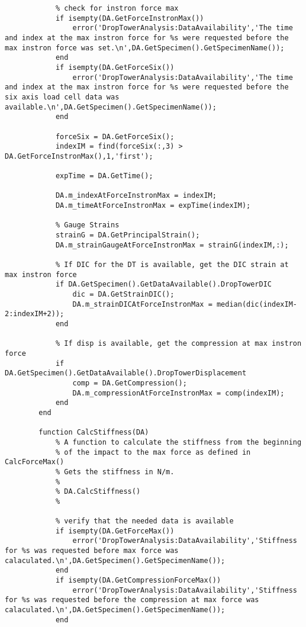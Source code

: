 \begin{lstlisting}
            % check for instron force max
            if isempty(DA.GetForceInstronMax())
                error('DropTowerAnalysis:DataAvailability','The time and index at the max instron force for %s were requested before the max instron force was set.\n',DA.GetSpecimen().GetSpecimenName());
            end
            if isempty(DA.GetForceSix())
                error('DropTowerAnalysis:DataAvailability','The time and index at the max instron force for %s were requested before the six axis load cell data was available.\n',DA.GetSpecimen().GetSpecimenName());
            end
            
            forceSix = DA.GetForceSix();
            indexIM = find(forceSix(:,3) > DA.GetForceInstronMax(),1,'first');
            
            expTime = DA.GetTime();
            
            DA.m_indexAtForceInstronMax = indexIM;
            DA.m_timeAtForceInstronMax = expTime(indexIM);
            
            % Gauge Strains
            strainG = DA.GetPrincipalStrain();
            DA.m_strainGaugeAtForceInstronMax = strainG(indexIM,:);
            
            % If DIC for the DT is available, get the DIC strain at max instron force
            if DA.GetSpecimen().GetDataAvailable().DropTowerDIC
                dic = DA.GetStrainDIC();
                DA.m_strainDICAtForceInstronMax = median(dic(indexIM-2:indexIM+2));
            end
            
            % If disp is available, get the compression at max instron force
            if DA.GetSpecimen().GetDataAvailable().DropTowerDisplacement
                comp = DA.GetCompression();
                DA.m_compressionAtForceInstronMax = comp(indexIM);
            end
        end
        
        function CalcStiffness(DA)
            % A function to calculate the stiffness from the beginning 
            % of the impact to the max force as defined in CalcForceMax()
            % Gets the stiffness in N/m.
            %
            % DA.CalcStiffness()
            %
            
            % verify that the needed data is available
            if isempty(DA.GetForceMax())
                error('DropTowerAnalysis:DataAvailability','Stiffness for %s was requested before max force was calaculated.\n',DA.GetSpecimen().GetSpecimenName());
            end           
            if isempty(DA.GetCompressionForceMax())
                error('DropTowerAnalysis:DataAvailability','Stiffness for %s was requested before the compression at max force was calaculated.\n',DA.GetSpecimen().GetSpecimenName());
            end
            

\end{lstlisting}
